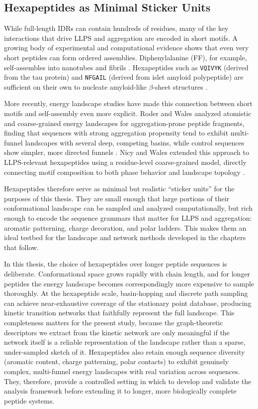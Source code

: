 \subsection{Hexapeptides as Minimal Sticker Units}

While full-length IDRs can contain hundreds of residues, many of the key
interactions that drive LLPS and aggregation are encoded in short motifs. A
growing body of experimental and computational evidence shows that even very
short peptides can form ordered assemblies. Diphenylalanine (FF), for example,
self-assembles into nanotubes and fibrils \cite{Gazit2003}. Hexapeptides such as
\texttt{VQIVYK} (derived from the tau protein) and \texttt{NFGAIL} (derived from
islet amyloid polypeptide) are sufficient on their own to nucleate amyloid-like
$\beta$-sheet structures \cite{Eisenberg2005Hex}.

More recently, energy landscape studies have made this connection between short
motifs and self-assembly even more explicit. Roder and Wales analyzed
atomistic and coarse-grained energy landscapes for aggregation-prone peptide
fragments, finding that sequences with strong aggregation propensity tend to
exhibit multi-funnel landscapes with several deep, competing basins, while
control sequences show simpler, more directed funnels
\cite{Roder2018HexLandscapes}. Nicy and Wales extended this approach to
LLPS-relevant hexapeptides using a residue-level coarse-grained model,
directly connecting motif composition to both phase behavior and landscape
topology \cite{Nicy2024Mpipi,Wales2023PeptideTrees}.

Hexapeptides therefore serve as minimal but realistic ``sticker units'' for the
purposes of this thesis. They are small enough that large portions of their
conformational landscape can be sampled and analyzed computationally, but rich
enough to encode the sequence grammars that matter for LLPS and aggregation:
aromatic patterning, charge decoration, and polar ladders. This makes them an
ideal testbed for the landscape and network methods developed in the chapters
that follow.

In this thesis, the choice of hexapeptides over longer peptide sequences is deliberate.
Conformational space grows rapidly with chain length, and for longer peptides
the energy landscape becomes correspondingly more expensive to sample
thoroughly. At the hexapeptide scale, basin-hopping and discrete path sampling
can achieve near-exhaustive coverage of the stationary point database, producing
kinetic transition networks that faithfully represent the full landscape. This
completeness matters for the present study, because the graph-theoretic
descriptors we extract from the kinetic network are only meaningful if the
network itself is a reliable representation of the landscape rather than a
sparse, under-sampled sketch of it. Hexapeptides also retain enough sequence
diversity (aromatic content, charge patterning, polar contacts) to exhibit
genuinely complex, multi-funnel energy landscapes with real variation across
sequences. They, therefore, provide a controlled setting in which to develop and
validate the analysis framework before extending it to longer, more
biologically complete peptide systems.



